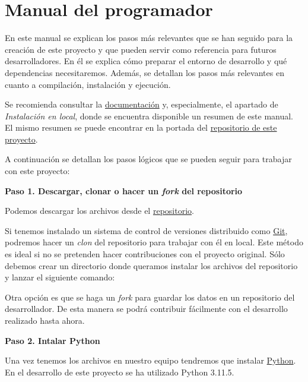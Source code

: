 \section{Manual del programador}

En este manual se explican los pasos más relevantes que se han seguido para la creación de este proyecto y que pueden servir como referencia para futuros desarrolladores. En él se explica cómo preparar el entorno de desarrollo y qué dependencias necesitaremos. Además, se detallan los pasos más relevantes en cuanto a compilación, instalación y ejecución.

Se recomienda consultar la \href{https://fat.readthedocs.io/es/latest/intro.html#}{documentación} y, especialmente, el apartado de \emph{Instalación en local}, donde se encuentra disponible un resumen de este manual. El mismo resumen se puede encontrar en la portada del \href{https://github.com/rmt0009alu/FAT}{repositorio de este proyecto}. 

A continuación se detallan los pasos lógicos que se pueden seguir para trabajar con este proyecto:



\textbf{Paso 1. Descargar, clonar o hacer un \emph{fork} del repositorio}

Podemos descargar los archivos desde el \href{https://github.com/rmt0009alu/FAT}{repositorio}. 


Si tenemos instalado un sistema de control de versiones distribuido como \href{https://git-scm.com/downloads}{Git}, podremos hacer un \emph{clon} del repositorio para trabajar con él en local. Este método es ideal si no se pretenden hacer contribuciones con el proyecto original. Sólo debemos crear un directorio donde queramos instalar los archivos del repositorio y lanzar el siguiente comando:


Otra opción es que se haga un \emph{fork} para guardar los datos en un repositorio del desarrollador. De esta manera se podrá contribuir fácilmente con el desarrollo realizado hasta ahora. 



\textbf{Paso 2. Intalar Python}

Una vez tenemos los archivos en nuestro equipo tendremos que instalar \href{https://www.python.org/downloads/}{Python}. En el desarrollo de este proyecto se ha utilizado Python 3.11.5. 



